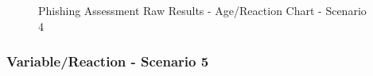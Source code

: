 \documentclass[a4paper]{article}
\begin{document}
\vspace{5mm}

\begin{figure}[H]
	\centering
	\caption{Phishing Assessment Raw Results - Age/Reaction Chart - Scenario 4}
	\label{chart-age-s4}
\end{figure}

\newpage

\subsubsection*{Variable/Reaction - Scenario 5}
\end{document}
